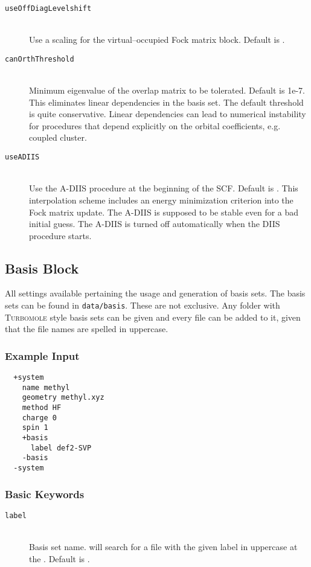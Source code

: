 \begin{description}
    \item [\texttt{useOffDiagLevelshift}]\hfill \\
    Use a scaling for the virtual--occupied Fock matrix block. Default is .
    \item [\texttt{canOrthThreshold}]\hfill \\
    Minimum eigenvalue of the overlap matrix to be tolerated. Default is 1e-7. This eliminates linear dependencies
    in the basis set. The default threshold is quite conservative. Linear dependencies can lead to numerical instability
    for procedures that depend explicitly on the orbital coefficients, e.g. coupled cluster.
    \item [\texttt{useADIIS}]\hfill \\
    Use the A-DIIS procedure \cite{hu2010} at the beginning of the SCF. Default is . This interpolation scheme
    includes an energy minimization criterion into the Fock matrix update. The A-DIIS is supposed to be stable even for a
    bad initial guess. The A-DIIS is turned off automatically when the DIIS procedure starts.
 \end{description}

\subsection{Basis Block}\label{sec:system:basis}
All settings available pertaining the usage and generation of basis sets.
The basis sets can be found in \texttt{data/basis}. These are not exclusive. Any folder with \textsc{Turbomole}
style basis sets can be given and every file can be added to it, given that the file names are spelled in
uppercase.

\subsubsection{Example Input}
\begin{lstlisting}
  +system
    name methyl
    geometry methyl.xyz
    method HF
    charge 0
    spin 1
    +basis
      label def2-SVP
    -basis
  -system
 \end{lstlisting}
\subsubsection{Basic Keywords}
\begin{description}
 \item [\texttt{label}]\hfill \\
 Basis set name. \serenity will search for a file with the given label in uppercase at the . Default is .

\end{description}
